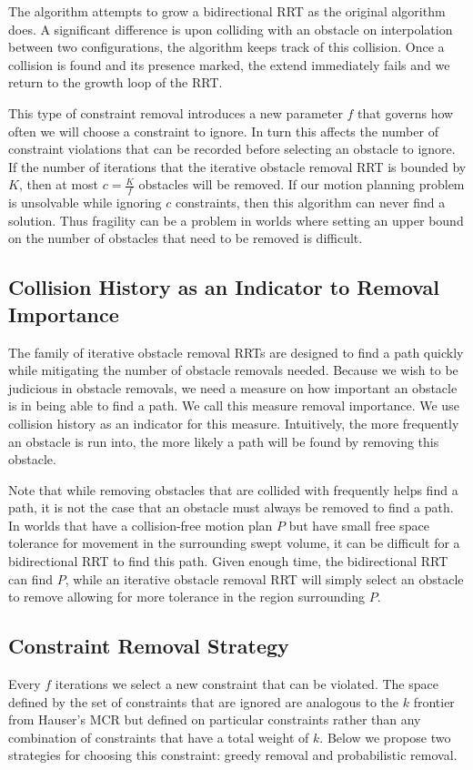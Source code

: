The algorithm attempts to grow a bidirectional RRT as the original algorithm does. A significant difference is upon colliding with an obstacle on interpolation between two configurations, the algorithm keeps track of this collision. Once a collision is found and its presence marked, the extend immediately fails and we return to the growth loop of the RRT. 

This type of constraint removal introduces a new parameter $f$ that governs how often we will choose a constraint to ignore. In turn this affects the number of constraint violations that can be recorded before selecting an obstacle to ignore. If the number of iterations that the iterative obstacle removal RRT is bounded by $K$, then at most $c=\frac{K}{f}$ obstacles will be removed. If our motion planning problem is unsolvable while ignoring $c$ constraints, then this algorithm can never find a solution. Thus fragility can be a problem in worlds where setting an upper bound on the number of obstacles that need to be removed is difficult.

\subsection{Collision History as an Indicator to Removal Importance}
The family of iterative obstacle removal RRTs are designed to find a path quickly while mitigating the number of obstacle removals needed. Because we wish to be judicious in obstacle removals, we need a measure on how important an obstacle is in being able to find a path. We call this measure removal importance. We use collision history as an indicator for this measure. Intuitively, the more frequently an obstacle is run into, the more likely a path will be found by removing this obstacle.

Note that while removing obstacles that are collided with frequently helps find a path, it is not the case that an obstacle must always be removed to find a path. In worlds that have a collision-free motion plan $P$ but have small free space tolerance for movement in the surrounding swept volume, it can be difficult for a bidirectional RRT to find this path. Given enough time, the bidirectional RRT can find $P$, while an iterative obstacle removal RRT will simply select an obstacle to remove allowing for more tolerance in the region surrounding $P$.

\subsection{Constraint Removal Strategy}
Every $f$ iterations we select a new constraint that can be violated. The space defined by the set of constraints that are ignored are analogous to the $k$ frontier from Hauser's MCR but defined on particular constraints rather than any combination of constraints that have a total weight of $k$. Below we propose two strategies for choosing this constraint: greedy removal and probabilistic removal.

